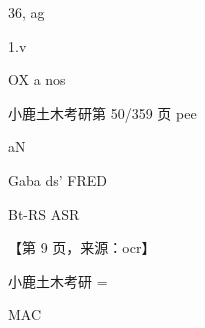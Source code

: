 \documentclass[UTF8,12pt,a4paper,openany]{ctexbook}
\begin{document}
\begin{enumerate}[label=\textbf{\arabic*.},leftmargin=2em]
\par 36,         ag\par 1.v\par OX a nos\par 小鹿土木考研第 50/359 页                        pee\par aN\par Gaba ds' FRED\par Bt-RS ASR\par \par 【第 9 页，来源：ocr】\par 小鹿土木考研       =\par MAC 
\end{enumerate}
\end{document}
